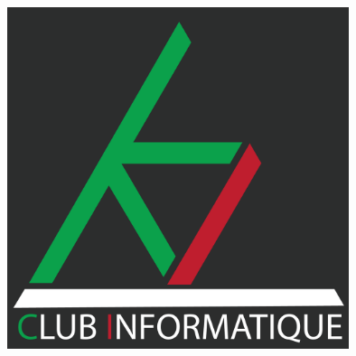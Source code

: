 \documentclass{../templates/enpc-ki/ki019}
\begin{document}
    \begin{figure}[H]
      \centering
      \includegraphics[width=10cm]{page2}
    \end{figure}
\end{document}
